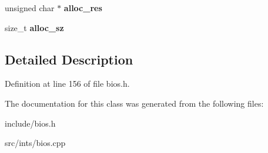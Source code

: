 \begin{DoxyCompactItemize}
\item 
\hypertarget{classISAPnPDevice_ab7645d92be95729a5f745d0735342296}{unsigned char $\ast$ {\bfseries alloc\-\_\-res}}\label{classISAPnPDevice_ab7645d92be95729a5f745d0735342296}

\item 
\hypertarget{classISAPnPDevice_ae872e27861732e57001057215332f53f}{size\-\_\-t {\bfseries alloc\-\_\-sz}}\label{classISAPnPDevice_ae872e27861732e57001057215332f53f}

\end{DoxyCompactItemize}


\subsection{Detailed Description}


Definition at line 156 of file bios.\-h.



The documentation for this class was generated from the following files\-:\begin{DoxyCompactItemize}
\item 
include/bios.\-h\item 
src/ints/bios.\-cpp\end{DoxyCompactItemize}

